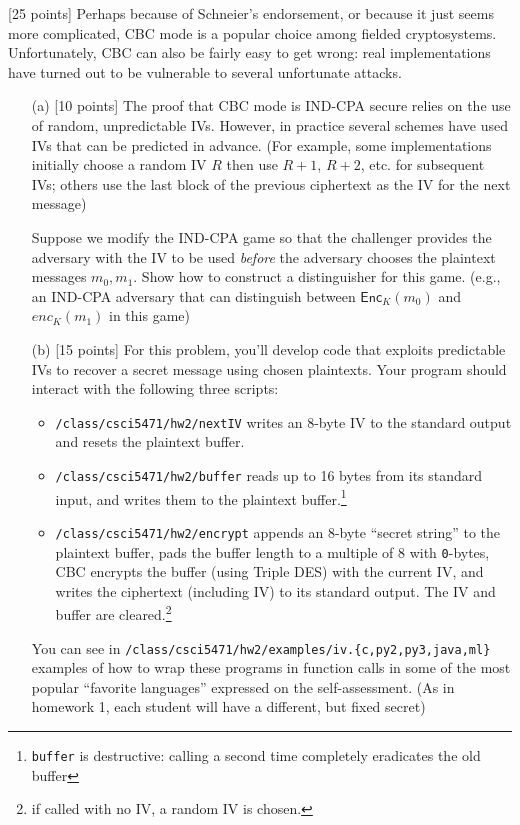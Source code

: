 \documentclass[11pt]{article}
\newcounter{qnum}
\newcommand{\question}[1]{\stepcounter{qnum}\bigskip\noindent{\bf \arabic{qnum}. #1.}}
\newcommand{\enc}{\textsf{Enc}}
\begin{document}
\question{Cryptanalysis: Un-chain my block} [25 points] Perhaps
because of Schneier's endorsement, or because it just seems more
complicated, CBC mode is a popular choice among fielded
cryptosystems.  Unfortunately, CBC can also be fairly easy to get
wrong: real implementations have turned out to be vulnerable to
several unfortunate attacks.
\begin{itemize}
\item[(a)] [10 points] The proof that CBC mode is IND-CPA secure
  relies on the use of random, unpredictable IVs.  However, in
  practice several schemes have used IVs that can be predicted in
  advance.  (For example, some implementations initially choose a
  random IV $R$ then use $R+1$, $R+2$, etc. for subsequent IVs; others
  use the last block of the previous ciphertext as the IV for the next
  message)

  Suppose we modify the IND-CPA game so that the challenger provides
  the adversary with the IV to be used {\em before} the adversary
  chooses the plaintext messages $m_0,m_1$. Show how to construct a
  distinguisher for this game.  (e.g., an IND-CPA adversary that can
  distinguish between $\enc_K(m_0)$ and $enc_K(m_1)$ in this game)

\item[(b)] [15 points] For this problem, you'll develop code that
  exploits predictable IVs to recover a secret message using chosen
  plaintexts.  Your program should interact with the following three
  scripts:
  \begin{itemize}
    \item \verb#/class/csci5471/hw2/nextIV# writes an 8-byte IV to the
      standard output and resets the plaintext buffer.
    \item \verb#/class/csci5471/hw2/buffer# reads up to 16 bytes from
      its standard input, and writes them to the plaintext
      buffer.\footnote{{\tt buffer} is destructive: calling a second
        time completely eradicates the old buffer}
    \item \verb#/class/csci5471/hw2/encrypt#  appends an 8-byte
      ``secret string'' to the plaintext buffer, pads the buffer
      length to a multiple of 8 with {\tt 0}-bytes, CBC encrypts the
      buffer (using Triple DES) with the current IV, and writes the ciphertext (including
      IV) to its standard output.  The IV and buffer are cleared.\footnote{if called with no IV, a random IV is chosen.} 
  \end{itemize}
  You can see in \verb#/class/csci5471/hw2/examples/iv.{c,py2,py3,java,ml}# examples of
  how to wrap these programs in function calls in some of the most
  popular ``favorite languages'' expressed on the self-assessment.
  (As in homework 1, each student will have a different, but fixed
  secret)


\end{itemize}
\end{document}
